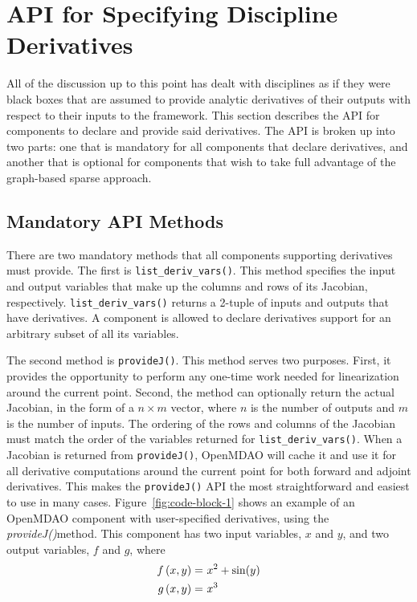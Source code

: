 \documentclass[]{aiaa-tc} %
\begin{document}
    \section{API for Specifying Discipline Derivatives}

        All of the discussion up to this point has dealt with disciplines as if they were black boxes
        that are assumed to provide analytic derivatives of their outputs with respect to their inputs
        to the framework. This section describes the API for components to declare and provide
        said derivatives. The API is broken up into two parts: one that is mandatory for all components
        that declare derivatives, and another that is optional for components that wish to take full
        advantage of the graph-based sparse approach.

        \subsection{Mandatory API Methods}

        There are two mandatory methods that all components supporting derivatives must provide.
        The first is \texttt{list\_deriv\_vars()}. This method specifies the
        input and output variables that make up the columns and rows of its Jacobian, respectively.
        \texttt{list\_deriv\_vars()} returns a 2-tuple of inputs and outputs that have derivatives.
        A component is allowed to declare derivatives support for an arbitrary subset of all its variables.

        The second method is \texttt{provideJ()}. This method serves two purposes. First, it provides the
        opportunity to perform any one-time work needed for linearization around the current point. Second,
        the method can optionally return the actual Jacobian, in the form of a $n \times m$ vector, where $n$ is the
        number of outputs and $m$ is the number of inputs. The ordering of the rows and columns of the Jacobian
        must match the order of the variables returned for \texttt{list\_deriv\_vars()}. When a Jacobian is
        returned from \texttt{provideJ()}, OpenMDAO will cache it and use it for all derivative computations
        around the current point for both forward and adjoint derivatives. This makes the \texttt{provideJ()}
        API the most straightforward and easiest to use in many cases. Figure~\ref{fig:code-block-1} shows
        an example of an OpenMDAO component with user-specified derivatives, using the \textit{provideJ()}method.
        This component has two input variables, $x$ and $y$, and two output variables, $f$ and $g$, where
        \begin{align}
            f\left(x, y\right) =&\  x^2 + \sin(y) \\ \notag
            g\left(x, y\right) =&\  x^3
        \end{align}
\end{document}
